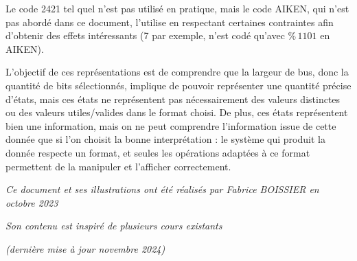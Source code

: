 \documentclass[11pt,a4paper]{article}
\begin{document}
\bigskip

Le code 2421 tel quel n'est pas utilisé en pratique, mais le code AIKEN, qui n'est pas abordé dans ce document, l'utilise en respectant certaines contraintes afin d'obtenir des effets intéressants (7 par exemple, n'est codé qu'avec $ \text{\%} \, 1101 $ en AIKEN).


\bigskip

\bigskip

\bigskip


L'objectif de ces représentations est de comprendre que la largeur de bus, donc la quantité de bits sélectionnés, implique de pouvoir représenter une quantité précise d'états, mais ces états ne représentent pas nécessairement des valeurs distinctes ou des valeurs utiles/valides dans le format choisi.
De plus, ces états représentent bien une information, mais on ne peut comprendre l'information issue de cette donnée que si l'on choisit la bonne interprétation : le système qui produit la donnée respecte un format, et seules les opérations adaptées à ce format permettent de la manipuler et l'afficher correctement.



\bigskip

\vfillFirst

\vfillLast


\begin{center}
\textit{Ce document et ses illustrations ont été réalisés par Fabrice BOISSIER en octobre 2023}

\textit{Son contenu est inspiré de plusieurs cours existants}

\textit{(dernière mise à jour novembre 2024)}
\end{center}
\end{document}
